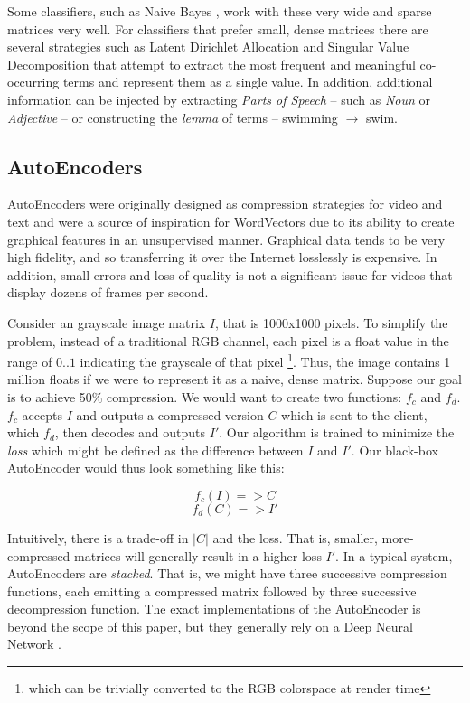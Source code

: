 \par{
Some classifiers, such as Naive Bayes \cite{}, work with these very wide and sparse matrices very well. For classifiers that prefer small, dense matrices there are several strategies such as Latent Dirichlet Allocation \cite{} and Singular Value Decomposition \cite{} that attempt to extract the most frequent and meaningful co-occurring terms and represent them as a single value. In addition, additional information can be injected by extracting \textit{Parts of Speech} -- such as \textit{Noun} or \textit{Adjective} -- or constructing the \textit{lemma} of terms -- swimming $\rightarrow$ swim. 
}


\subsection{AutoEncoders}

\par{
AutoEncoders were originally designed as compression strategies for video and text and were a source of inspiration for WordVectors due to its ability to create graphical features in an unsupervised manner. Graphical data tends to be very high fidelity, and so transferring it over the Internet losslessly is expensive. In addition, small errors and loss of quality is not a significant issue for videos that display dozens of frames per second.
}

\par{
Consider an grayscale image matrix $I$, that is \textsf{1000x1000} pixels. To simplify the problem, instead of a traditional RGB channel, each pixel is a float value in the range of $0..1$ indicating the grayscale of that pixel \footnote{which can be trivially converted to the RGB colorspace at render time}. Thus, the image contains 1 million floats if we were to represent it as a naive, dense matrix. Suppose our goal is to achieve 50\% compression. We would want to create two functions: $f_c$ and $f_d$. $f_c$ accepts $I$ and outputs a compressed version $C$ which is sent to the client, which $f_d$, then decodes and outputs $I'$. Our algorithm is trained to minimize the \textit{loss} which might be defined as the difference between $I$ and $I'$. Our black-box AutoEncoder would thus look something like this:
}

\[f_c(I) => C \]
\[ f_d(C) => I' \]

\par{
Intuitively, there is a trade-off in $|C|$ and the loss. That is, smaller, more-compressed matrices will generally result in a higher loss $I'$. In a typical system, AutoEncoders are \textit{stacked}. That is, we might have three successive compression functions, each emitting a compressed matrix followed by three successive decompression function.  The exact implementations of the AutoEncoder is beyond the scope of this paper, but they generally rely on a Deep Neural Network \cite{}.
}

